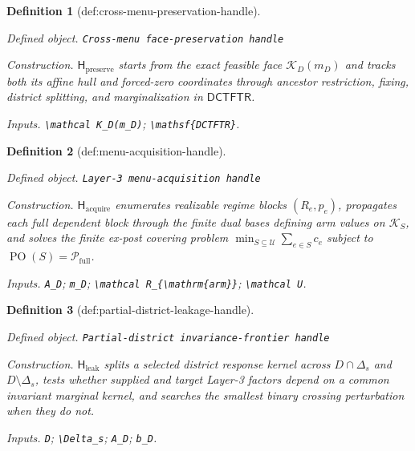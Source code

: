 \documentclass{article}
\newtheorem{definition}{Definition}
\begin{document}
\begin{definition}[def:cross-menu-preservation-handle]\label{def:cross-menu-preservation-handle}
\par\smallskip\noindent\emph{Defined object.} \texttt{Cross-\allowbreak{}menu face-\allowbreak{}preservation handle}
\par\smallskip\noindent\emph{Construction.} \(\mathsf H_{\mathrm{preserve}}\) starts from the exact feasible face \(\mathcal K_D(m_D)\) and tracks both its affine hull and forced-zero coordinates through ancestor restriction, fixing, district splitting, and marginalization in \(\mathsf{DCTFTR}\).
\par\smallskip\noindent\emph{Inputs.} \texttt{\textbackslash{}\allowbreak{}mathcal K\_\allowbreak{}D(m\_\allowbreak{}D)}; \texttt{\textbackslash{}\allowbreak{}mathsf\{DCTFTR\}\allowbreak{}}.
\end{definition}

\begin{definition}[def:menu-acquisition-handle]\label{def:menu-acquisition-handle}
\par\smallskip\noindent\emph{Defined object.} \texttt{Layer-\allowbreak{}3 menu-\allowbreak{}acquisition handle}
\par\smallskip\noindent\emph{Construction.} \(\mathsf H_{\mathrm{acquire}}\) enumerates realizable regime blocks \((R_e,p_e)\), propagates each full dependent block through the finite dual bases defining arm values on \(\mathcal K_S\), and solves the finite ex-post covering problem \(\min_{S\subseteq\mathcal U}\sum_{e\in S}c_e\) subject to \(\operatorname{PO}(S)=\mathcal P_{\mathrm{full}}\).
\par\smallskip\noindent\emph{Inputs.} \texttt{A\_\allowbreak{}D}; \texttt{m\_\allowbreak{}D}; \texttt{\textbackslash{}\allowbreak{}mathcal R\_\allowbreak{}\{\textbackslash{}\allowbreak{}mathrm\{arm\}\allowbreak{}\}\allowbreak{}}; \texttt{\textbackslash{}\allowbreak{}mathcal U}.
\end{definition}

\begin{definition}[def:partial-district-leakage-handle]\label{def:partial-district-leakage-handle}
\par\smallskip\noindent\emph{Defined object.} \texttt{Partial-\allowbreak{}district invariance-\allowbreak{}frontier handle}
\par\smallskip\noindent\emph{Construction.} \(\mathsf H_{\mathrm{leak}}\) splits a selected district response kernel across \(D\cap\Delta_s\) and \(D\setminus\Delta_s\), tests whether supplied and target Layer-3 factors depend on a common invariant marginal kernel, and searches the smallest binary crossing perturbation when they do not.
\par\smallskip\noindent\emph{Inputs.} \texttt{D}; \texttt{\textbackslash{}\allowbreak{}Delta\_\allowbreak{}s}; \texttt{A\_\allowbreak{}D}; \texttt{b\_\allowbreak{}D}.
\end{definition}
\end{document}
